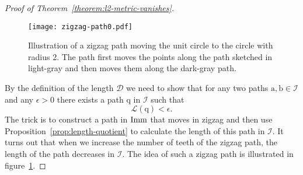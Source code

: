 \begin{proof}[Proof of Theorem~\ref{theorem:l2-metric-vanishes}]

  \begin{figure}
    \centerline{\texttt{[image: zigzag-path0.pdf]}}
    \caption[]{Illustration of a zigzag path moving the unit circle to the circle with radius 2. The path first moves the points along the path sketched in light-gray and then moves them along the dark-gray path.}
    \label{fig:zigzag-path}
  \end{figure}

  By the definition of the length $\mathcal{D}$ we need to show that for any two paths $\mathrm{a},\mathrm{b} \in \mathcal{I}$ and any $\epsilon >0 $ there exists a path $\mathrm{q}$ in $\mathcal{I}$ such that
  \begin{equation*}
    \mathcal{L}(\mathrm{q}) < \epsilon.
  \end{equation*}
  The trick is to construct a path in $\mathop{}\!\mathrm{Imm}$ that moves in zigzag and then use Proposition~\ref{prop:length-quotient} to calculate the length of this path in $\mathcal{I}$.
  It turns out that when we increase the number of teeth of the zigzag path, the length of the path decreases in $\mathcal{I}$.
  The idea of such a zigzag path is illustrated in figure~\ref{fig:zigzag-path}.


\end{proof}
